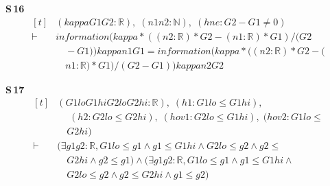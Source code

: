 \noindent\textbf{S\,16}\quad{}
{\footnotesize\[ \begin{aligned}[t]
&(\mathit{kappa} \mathit{G1} \mathit{G2} : \mathbb{R} ),\; (\mathit{n1} \mathit{n2} : \mathbb{N} ),\; (\mathit{hne} : \mathit{G2} - \mathit{G1} \neq 0)\\
\vdash\;&\mathit{information} (\mathit{kappa} * ((\mathit{n2} : \mathbb{R} ) * \mathit{G2} - (\mathit{n1} : \mathbb{R} ) * \mathit{G1}) / (\mathit{G2}\\
&\quad - \mathit{G1})) \mathit{kappa} \mathit{n1} \mathit{G1} = \mathit{information} (\mathit{kappa} * ((\mathit{n2} : \mathbb{R} ) * \mathit{G2} - (\\
&\quad \mathit{n1} : \mathbb{R} ) * \mathit{G1}) / (\mathit{G2} - \mathit{G1})) \mathit{kappa} \mathit{n2} \mathit{G2}
\end{aligned} \]}

\noindent\textbf{S\,17}\quad{}
{\footnotesize\[ \begin{aligned}[t]
&(\mathit{G1lo} \mathit{G1hi} \mathit{G2lo} \mathit{G2hi} : \mathbb{R} ),\; (\mathit{h1} : \mathit{G1lo} \leq \mathit{G1hi}),\\
&\quad \; (\mathit{h2} : \mathit{G2lo} \leq \mathit{G2hi}),\; (\mathit{hov1} : \mathit{G2lo} \leq \mathit{G1hi}),\; (\mathit{hov2} : \mathit{G1lo} \leq\\
&\quad \mathit{G2hi})\\
\vdash\;&(\exists \mathit{g1} \mathit{g2} : \mathbb{R} , \mathit{G1lo} \leq \mathit{g1} \wedge \mathit{g1} \leq \mathit{G1hi} \wedge \mathit{G2lo} \leq \mathit{g2} \wedge \mathit{g2} \leq\\
&\quad \mathit{G2hi} \wedge \mathit{g2} \leq \mathit{g1}) \wedge (\exists \mathit{g1} \mathit{g2} : \mathbb{R} , \mathit{G1lo} \leq \mathit{g1} \wedge \mathit{g1} \leq \mathit{G1hi} \wedge\\
&\quad \mathit{G2lo} \leq \mathit{g2} \wedge \mathit{g2} \leq \mathit{G2hi} \wedge \mathit{g1} \leq \mathit{g2})
\end{aligned} \]}

